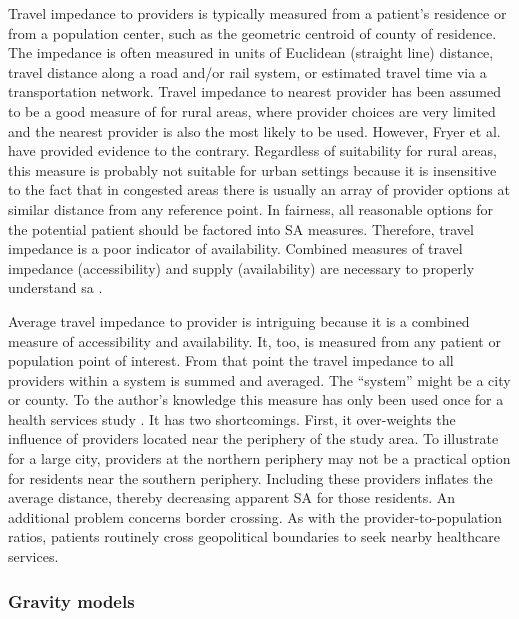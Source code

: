 
Travel impedance to providers is typically measured from a patient's residence or from a population center, such as the geometric centroid of county of residence. The impedance is often measured in units of Euclidean (straight line) distance, travel distance along a road and/or rail system, or estimated travel time via a transportation network. Travel impedance to nearest provider has been assumed to be a good measure of  for rural areas, where provider choices are very limited and the nearest provider is also the most likely to be used. However, Fryer et al. \cite{fryer_multi-method_1999} have provided evidence to the contrary. Regardless of suitability for rural areas, this measure is probably not suitable for urban settings because it is insensitive to the fact that in congested areas there is usually an array of provider options at similar distance from any reference point. In fairness, all reasonable options for the potential patient should be factored into SA measures. Therefore, travel impedance is a poor indicator of availability. Combined measures of travel impedance (accessibility) and supply (availability) are necessary to properly understand \ac{sa} \cite{fryer_multi-method_1999}.

Average travel impedance to provider is intriguing because it is a combined measure of accessibility and availability. It, too, is measured from any patient or population point of interest. From that point the travel impedance to all providers within a system is summed and averaged. The ``system'' might be a city or county. To the author's knowledge this measure has only been used once for a health services study \cite{dutt_assessment_1986}. It has two shortcomings. First, it over-weights the influence of providers located near the periphery of the study area. To illustrate for a large city, providers at the northern periphery may not be a practical option for residents near the southern periphery. Including these providers inflates the average distance, thereby decreasing apparent SA for those residents. An additional problem concerns border crossing. As with the provider-to-population ratios, patients routinely cross geopolitical boundaries to seek nearby healthcare services.

\subsubsection*{Gravity models}


